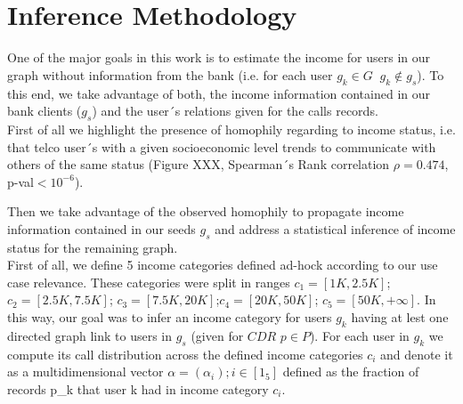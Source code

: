 \section{Inference Methodology}






One of the major goals in this work is to estimate the income for users in our graph without information from the bank (i.e. for each user $g_k \in G $ $\ g_k \notin g_s$). To this end, we take advantage of both, the income information contained in our bank clients ($g_s$) and the user´s relations given for the calls records. \\

First of all we highlight the presence of homophily regarding to income status, i.e. that telco user´s with a given socioeconomic level trends to communicate with others of the same status (Figure XXX, Spearman´s Rank correlation $\rho= 0.474$, p-val$<10^{-6}$). 

Then we take advantage of the observed homophily to propagate income information contained in our seeds $g_s$ and address a statistical inference of income status for the remaining graph. \\

First of all, we define 5 income categories defined ad-hock according to our use case relevance. These categories were split in ranges $c_1=[1K,2.5K]$; $c_2=[2.5K,7.5K]$; $c_3=[7.5K,20K]$;$c_4=[20K,50K]$; $c_5=[50K,+ \infty]$.  In this way, our goal was to infer an income category for users $g_k$ having at lest one directed graph link to users in $g_s$ (given for $CDR$  $p\in P$). For each user in $g_k$ we compute its call distribution across the defined income categories $c_i$ and denote it as a multidimensional vector $\alpha =(\alpha_i); i \in [1_5]$ defined as the fraction of records p_k that user k had in income category $c_i$. 


